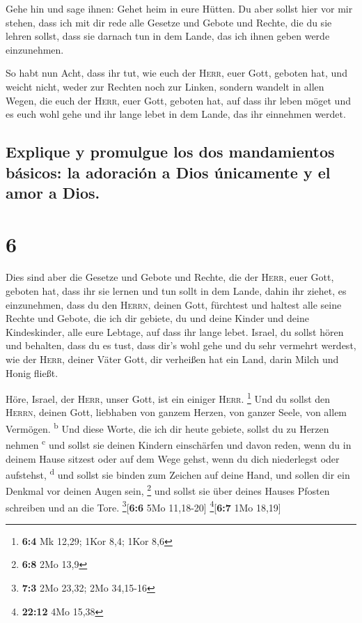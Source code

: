  Gehe hin und sage ihnen: Gehet heim in eure Hütten.
 Du aber sollst hier vor mir stehen, dass ich mit dir
rede alle Gesetze und Gebote und Rechte, die du sie lehren sollst, dass
sie darnach tun in dem Lande, das ich ihnen geben werde einzunehmen.

 So habt nun Acht, dass ihr tut, wie euch der
\textsc{Herr}, euer Gott, geboten hat, und weicht nicht, weder zur
Rechten noch zur Linken,  sondern wandelt in allen Wegen,
die euch der \textsc{Herr}, euer Gott, geboten hat, auf dass ihr leben
möget und es euch wohl gehe und ihr lange lebet in dem Lande, das ihr
einnehmen werdet.

\hypertarget{explique-y-promulgue-los-dos-mandamientos-buxe1sicos-la-adoraciuxf3n-a-dios-uxfanicamente-y-el-amor-a-dios.}{%
\subsection{Explique y promulgue los dos mandamientos básicos: la
adoración a Dios únicamente y el amor a
Dios.}\label{explique-y-promulgue-los-dos-mandamientos-buxe1sicos-la-adoraciuxf3n-a-dios-uxfanicamente-y-el-amor-a-dios.}}

\hypertarget{section-5}{%
\section{6}\label{section-5}}

 Dies sind aber die Gesetze und Gebote und Rechte, die der
\textsc{Herr}, euer Gott, geboten hat, dass ihr sie lernen und tun sollt
in dem Lande, dahin ihr ziehet, es einzunehmen,  dass du
den \textsc{Herrn}, deinen Gott, fürchtest und haltest alle seine Rechte
und Gebote, die ich dir gebiete, du und deine Kinder und deine
Kindeskinder, alle eure Lebtage, auf dass ihr lange lebet.
 Israel, du sollst hören und behalten, dass du es tust,
dass dir's wohl gehe und du sehr vermehrt werdest, wie der
\textsc{Herr}, deiner Väter Gott, dir verheißen hat ein Land, darin
Milch und Honig fließt.

 Höre, Israel, der \textsc{Herr}, unser Gott, ist ein
einiger \textsc{Herr}. \footnote{\textbf{6:4} Mk 12,29; 1Kor 8,4; 1Kor
  8,6}  Und du sollst den \textsc{Herrn}, deinen Gott,
liebhaben von ganzem Herzen, von ganzer Seele, von allem Vermögen.
\textsuperscript{b}  Und diese Worte, die ich dir heute
gebiete, sollst du zu Herzen nehmen \textsuperscript{c} 
und sollst sie deinen Kindern einschärfen und davon reden, wenn du in
deinem Hause sitzest oder auf dem Wege gehst, wenn du dich niederlegst
oder aufstehst, \textsuperscript{d}  und sollst sie binden
zum Zeichen auf deine Hand, und sollen dir ein Denkmal vor deinen Augen
sein, \footnote{\textbf{6:8} 2Mo 13,9}  und sollst sie
über deines Hauses Pfosten schreiben und an die Tore.
\footnote{\textbf{7:3} 2Mo 23,32; 2Mo 34,15-16}{[}\textbf{6:6} 5Mo
11,18-20{]} \footnote{\textbf{22:12} 4Mo 15,38}{[}\textbf{6:7} 1Mo
18,19{]}

